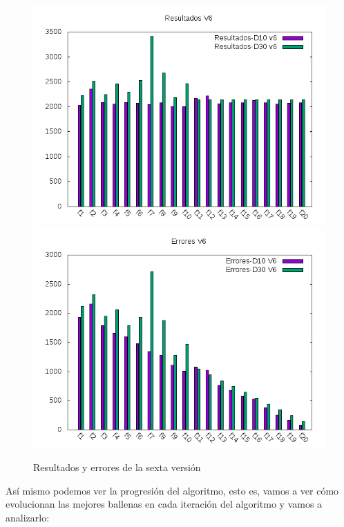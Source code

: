 \documentclass[12pt,a4paper]{article}
\begin{document}
	\newpage
	
	\begin{figure}[!h]
		\includegraphics[scale=0.5]{../Algoritmo/resultados/Imagenes/Resultados/resultados_v6.png}
		\includegraphics[scale=0.5]{../Algoritmo/resultados/Imagenes/Errores/errores_v6.png}
		\caption{Resultados y errores de la sexta versión}
	\end{figure}

	Así mismo podemos ver la progresión del algoritmo, esto es, vamos a ver cómo evolucionan las mejores ballenas en cada iteración del algoritmo y vamos a analizarlo:
	
\end{document}
